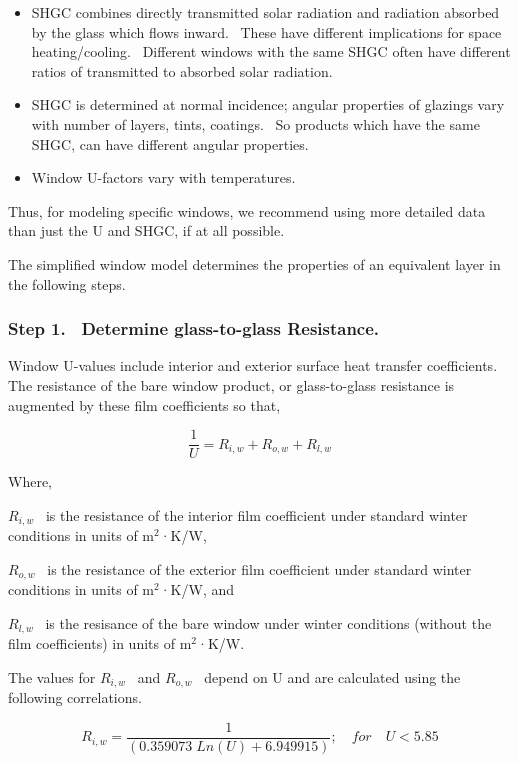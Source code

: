 \begin{itemize}
\item
  SHGC combines directly transmitted solar radiation and radiation absorbed by the glass which flows inward.~ These have different implications for space heating/cooling.~ Different windows with the same SHGC often have different ratios of transmitted to absorbed solar radiation.
\item
  SHGC is determined at normal incidence; angular properties of glazings vary with number of layers, tints, coatings.~ So products which have the same SHGC, can have different angular properties.
\item
  Window U-factors vary with temperatures.
\end{itemize}

Thus, for modeling specific windows, we recommend using more detailed data than just the U and SHGC, if at all possible.

The simplified window model determines the properties of an equivalent layer in the following steps.

\subsubsection{Step 1.~ Determine glass-to-glass Resistance.}\label{step-1.-determine-glass-to-glass-resistance.}

Window U-values include interior and exterior surface heat transfer coefficients.~ The resistance of the bare window product, or glass-to-glass resistance is augmented by these film coefficients so that,

\begin{equation}
\frac{1}{U} = {R_{i,w}} + {R_{o,w}} + {R_{l,w}}
\end{equation}

Where,

\({R_{i,w}}\) ~is the resistance of the interior film coefficient under standard winter conditions in units of m\(^{2}\)·K/W,

\({R_{o,w}}\) ~is the resistance of the exterior film coefficient under standard winter conditions in units of m\(^{2}\)·K/W, and

\({R_{l,w}}\) ~is the resisance of the bare window under winter conditions (without the film coefficients) in units of m\(^{2}\)·K/W.

The values for \({R_{i,w}}\) ~and \({R_{o,w}}\) ~depend on U and are calculated using the following correlations.

\begin{equation}
{R_{i,w}} = \frac{1}{{(0.359073\;Ln(U) + 6.949915)}};\quad for\quad U < 5.85
\end{equation}


